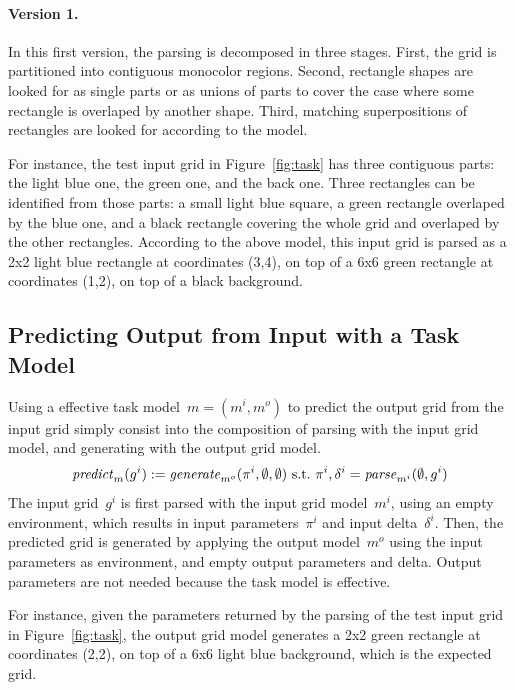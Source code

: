 \documentclass[a4paper]{llncs}
\begin{document}
\paragraph{Version 1.} In this first version, the parsing is
decomposed in three stages. First, the grid is partitioned into
contiguous monocolor regions. Second, rectangle shapes are looked for
as single parts or as unions of parts to cover the case where some
rectangle is overlaped by another shape. Third, matching
superpositions of rectangles are looked for according to the model.

For instance, the test input grid in Figure~\ref{fig:task} has three
contiguous parts: the light blue one, the green one, and the back
one. Three rectangles can be identified from those parts: a small
light blue square, a green rectangle overlaped by the blue one, and a
black rectangle covering the whole grid and overlaped by the other
rectangles. According to the above model, this input grid is parsed as
a 2x2 light blue rectangle at coordinates (3,4), on top of a 6x6 green
rectangle at coordinates (1,2), on top of a black background.

\subsection{Predicting Output from Input with a Task Model}
\label{predicting}


Using a effective task model~$m = (m^i,m^o)$ to predict the output
grid from the input grid simply consist into the composition of
parsing with the input grid model, and generating with the output grid
model.
\[ {\it predict}_m(g^i) := {\it
    generate}_{m^o}(\pi^i,\emptyset,\emptyset) \textrm{~s.t.~} \pi^i,
  \delta^i = {\it parse}_{m^i}(\emptyset, g^i) \] 
%
The input grid~$g^i$ is first parsed with the input grid model~$m^i$,
using an empty environment, which results in input parameters~$\pi^i$
and input delta~$\delta^i$. Then, the predicted grid is generated by
applying the output model~$m^o$ using the input parameters as
environment, and empty output parameters and delta. Output parameters
are not needed because the task model is effective.

For instance, given the parameters returned by the parsing of the test
input grid in Figure~\ref{fig:task}, the output grid model generates a
2x2 green rectangle at coordinates (2,2), on top of a 6x6 light blue
background, which is the expected grid.
\end{document}
